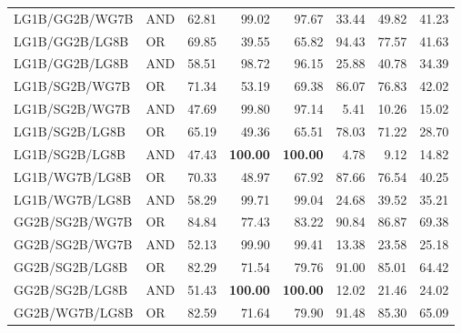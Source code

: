 \documentclass{article}
\begin{document}
{\begin{longtable}{llrrrrrr}
 LG1B/GG2B/WG7B           & AND     & 62.81             & 99.02             & 97.67             & 33.44            & 49.82            & 41.23             \\
 LG1B/GG2B/LG8B           & OR      & 69.85             & 39.55             & 65.82             & 94.43            & 77.57            & 41.63             \\
 LG1B/GG2B/LG8B           & AND     & 58.51             & 98.72             & 96.15             & 25.88            & 40.78            & 34.39             \\
 LG1B/SG2B/WG7B           & OR      & 71.34             & 53.19             & 69.38             & 86.07            & 76.83            & 42.02             \\
 LG1B/SG2B/WG7B           & AND     & 47.69             & 99.80             & 97.14             & 5.41             & 10.26            & 15.02             \\
 LG1B/SG2B/LG8B           & OR      & 65.19             & 49.36             & 65.51             & 78.03            & 71.22            & 28.70             \\
 LG1B/SG2B/LG8B           & AND     & 47.43             & \textbf{100.00}   & \textbf{100.00}   & 4.78             & 9.12             & 14.82             \\
 LG1B/WG7B/LG8B           & OR      & 70.33             & 48.97             & 67.92             & 87.66            & 76.54            & 40.25             \\
 LG1B/WG7B/LG8B           & AND     & 58.29             & 99.71             & 99.04             & 24.68            & 39.52            & 35.21             \\
 GG2B/SG2B/WG7B           & OR      & 84.84             & 77.43             & 83.22             & 90.84            & 86.87            & 69.38             \\
 GG2B/SG2B/WG7B           & AND     & 52.13             & 99.90             & 99.41             & 13.38            & 23.58            & 25.18             \\
 GG2B/SG2B/LG8B           & OR      & 82.29             & 71.54             & 79.76             & 91.00            & 85.01            & 64.42             \\
 GG2B/SG2B/LG8B           & AND     & 51.43             & \textbf{100.00}   & \textbf{100.00}   & 12.02            & 21.46            & 24.02             \\
 GG2B/WG7B/LG8B           & OR      & 82.59             & 71.64             & 79.90             & 91.48            & 85.30            & 65.09             \\

\end{longtable}}
\end{document}
